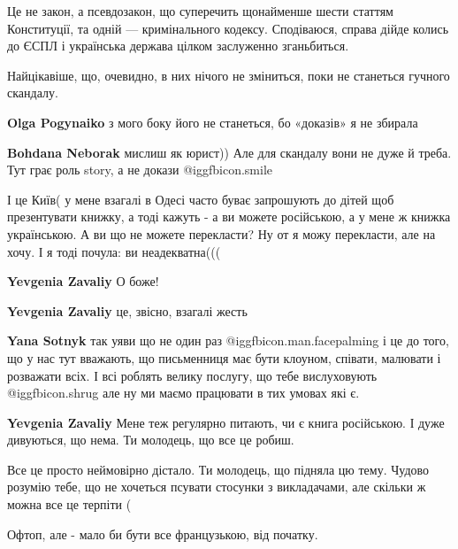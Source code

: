 \begin{itemize}
\begin{itemize}

Це не закон, а псевдозакон, що суперечить щонайменше шести статтям Конституції,
та одній — кримінального кодексу.  Сподіваюся, справа дійде колись до ЄСПЛ і
українська держава цілком заслуженно зганьбиться.

\end{itemize} %


Найцікавіше, що, очевидно, в них нічого не зміниться, поки не станеться гучного
скандалу.

\begin{itemize} %
\textbf{Olga Pogynaiko} з мого боку його не станеться, бо «доказів» я не збирала

\textbf{Bohdana Neborak} мислиш як юрист)) Але для скандалу вони не дуже й треба. Тут грає роль story, а не докази  @igg{fbicon.smile} 
\end{itemize} %


І це Київ( у мене взагалі в Одесі часто буває запрошують до дітей щоб
презентувати книжку, а тоді кажуть - а ви можете російською, а у мене ж книжка
українською. А ви що не можете перекласти? Ну от я можу перекласти, але на
хочу. І я тоді почула: ви неадекватна(((

\begin{itemize} %
\textbf{Yevgenia Zavaliy} О боже!

\textbf{Yevgenia Zavaliy} це, звісно, взагалі жесть

\textbf{Yana Sotnyk} так уяви що не один раз  @igg{fbicon.man.facepalming}  і це до того, що у нас тут вважають, що письменниця має бути клоуном, співати, малювати і розважати всіх. І всі роблять велику послугу, що тебе вислуховують  @igg{fbicon.shrug}  але ну ми маємо працювати в тих умовах які є.

\textbf{Yevgenia Zavaliy} Мене теж регулярно питають, чи є книга російською. І дуже дивуються, що нема. Ти молодець, що все це робиш.
\end{itemize} %


Все це просто неймовірно дістало. Ти молодець, що підняла цю тему. Чудово
розумію тебе, що не хочеться псувати стосунки з викладачами, але скільки ж
можна все це терпіти (

Офтоп, але - мало би бути все французькою, від початку.


\end{itemize}
